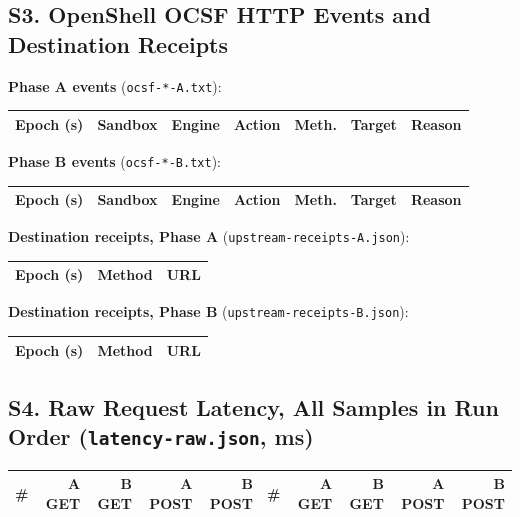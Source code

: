 \documentclass[journal]{IEEEtran}
\newcommand{\openshell}{OpenShell}
\begin{document}
\subsection*{S3. \openshell{} OCSF HTTP Events and Destination Receipts}
\textbf{Phase A events} (\texttt{ocsf-*-A.txt}):
\scriptsize
\begin{longtable}{rlllp{0.8cm}p{4.6cm}p{4.8cm}}
\toprule
\textbf{Epoch (s)} & \textbf{Sandbox} & \textbf{Engine} & \textbf{Action} & \textbf{Meth.} & \textbf{Target} & \textbf{Reason} \\
\midrule
\endhead

\end{longtable}
\normalsize
\textbf{Phase B events} (\texttt{ocsf-*-B.txt}):
\scriptsize
\begin{longtable}{rlllp{0.8cm}p{4.6cm}p{4.8cm}}
\toprule
\textbf{Epoch (s)} & \textbf{Sandbox} & \textbf{Engine} & \textbf{Action} & \textbf{Meth.} & \textbf{Target} & \textbf{Reason} \\
\midrule
\endhead

\end{longtable}
\normalsize
\textbf{Destination receipts, Phase A} (\texttt{upstream-receipts-A.json}):
\scriptsize
\begin{longtable}{rlp{11cm}}
\toprule
\textbf{Epoch (s)} & \textbf{Method} & \textbf{URL} \\
\midrule
\endhead

\end{longtable}
\normalsize
\textbf{Destination receipts, Phase B} (\texttt{upstream-receipts-B.json}):
\scriptsize
\begin{longtable}{rlp{11cm}}
\toprule
\textbf{Epoch (s)} & \textbf{Method} & \textbf{URL} \\
\midrule
\endhead

\end{longtable}

\normalsize
\subsection*{S4. Raw Request Latency, All Samples in Run Order (\texttt{latency-raw.json}, ms)}
\scriptsize
\begin{longtable}{r|rrrr||r|rrrr}
\toprule
\# & \textbf{A GET} & \textbf{B GET} & \textbf{A POST} & \textbf{B POST} & \# & \textbf{A GET} & \textbf{B GET} & \textbf{A POST} & \textbf{B POST} \\
\midrule
\endhead

\end{longtable}
\end{document}
